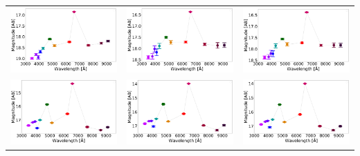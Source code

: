 \begin{table}[!h]
\begin{tabular}{ccc}
\includegraphics[width=0.3\linewidth, clip]{photopectrum_splus_MC0115-063029_aper.pdf} & \includegraphics[width=0.3\linewidth, clip]{photopectrum_splus_MC0115-063029_auto.pdf} & \includegraphics[width=0.3\linewidth, clip]{photopectrum_splus_MC0115-063029_petro.pdf} \\
\includegraphics[width=0.3\linewidth, clip]{photopectrum_splus_MC0115-105523_aper.pdf} & \includegraphics[width=0.3\linewidth, clip]{photopectrum_splus_MC0115-105523_auto.pdf} & \includegraphics[width=0.3\linewidth, clip]{photopectrum_splus_MC0115-105523_petro.pdf} \\

\end{tabular}
\end{table}
